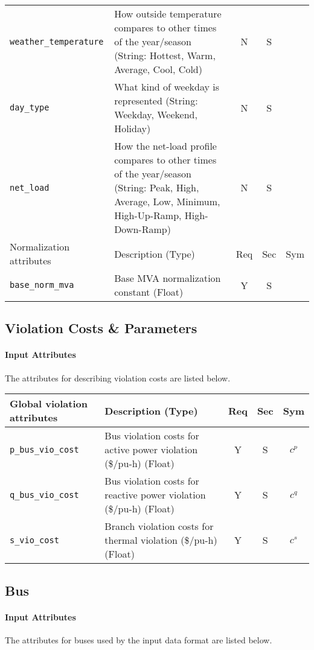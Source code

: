 \documentclass{article}
\begin{document}
\begin{center}
\begin{tabular}{ l | p{3.5in} | c | c | c |}
  {\tt weather\_temperature} & How outside temperature compares to other times of the year/season (String: Hottest, Warm, Average, Cool, Cold) & N & S & \\
  {\tt day\_type} & What kind of weekday is represented (String: Weekday, Weekend, Holiday) & N & S & \\
  {\tt net\_load} & How the net-load profile compares to other times of the year/season (String: Peak, High, Average, Low, Minimum, High-Up-Ramp, High-Down-Ramp) & N & S & \\
\hline
Normalization attributes & Description (Type) & Req & Sec & Sym\\
\hline
{\tt base\_norm\_mva} & Base MVA normalization constant (Float)  & Y & S &  \\
  \hline
\end{tabular}
\end{center}

\subsection{Violation Costs \& Parameters}
\label{nom:violation}
\paragraph{Input Attributes} The attributes for describing violation costs are listed below.


\begin{center}
\small
\begin{tabular}{ l | l | c | c | c |}
Global violation attributes & Description (Type) & Req & Sec & Sym\\
\hline
    {\tt p\_bus\_vio\_cost} & Bus violation costs for active power violation (\$/pu-h) (Float)& Y & S & $c^{p}$\\
    {\tt q\_bus\_vio\_cost} & Bus violation costs for reactive power violation  (\$/pu-h) (Float)& Y & S &$c^{q}$ \\
    {\tt s\_vio\_cost} & Branch violation costs for thermal violation (\$/pu-h) (Float) & Y & S &$c^{s}$  \\
\hline
\end{tabular}
\end{center}


\subsection{Bus}
\label{nom:bus}
\paragraph{Input Attributes} The attributes for buses used by the input data format are listed below.
\end{document}
